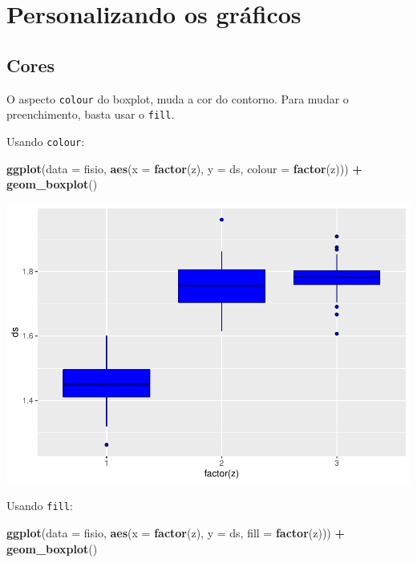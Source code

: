 \documentclass[
]{book}
\newenvironment{Shaded}{\begin{snugshade}}{\end{snugshade}}
\newcommand{\DataTypeTok}[1]{\textcolor[rgb]{0.13,0.29,0.53}{#1}}
\newcommand{\KeywordTok}[1]{\textcolor[rgb]{0.13,0.29,0.53}{\textbf{#1}}}
\newcommand{\NormalTok}[1]{#1}
\newcommand{\OperatorTok}[1]{\textcolor[rgb]{0.81,0.36,0.00}{\textbf{#1}}}
\newcommand{\StringTok}[1]{\textcolor[rgb]{0.31,0.60,0.02}{#1}}
\begin{document}
\hypertarget{personalizando-os-gruxe1ficos-1}{%
\section{Personalizando os gráficos}\label{personalizando-os-gruxe1ficos-1}}

\hypertarget{cores-1}{%
\subsection{Cores}\label{cores-1}}

O aspecto \texttt{colour} do boxplot, muda a cor do contorno. Para mudar o preenchimento, basta usar o \texttt{fill}.

Usando \texttt{colour}:

\begin{Shaded}
\begin{Highlighting}[]
\KeywordTok{ggplot}\NormalTok{(}\DataTypeTok{data =}\NormalTok{ fisio, }\KeywordTok{aes}\NormalTok{(}\DataTypeTok{x =} \KeywordTok{factor}\NormalTok{(z), }\DataTypeTok{y =}\NormalTok{ ds, }\DataTypeTok{colour =} \KeywordTok{factor}\NormalTok{(z))) }\OperatorTok{+}
\StringTok{  }\KeywordTok{geom_boxplot}\NormalTok{()}
\end{Highlighting}
\end{Shaded}

\includegraphics{TudodoR_files/figure-latex/unnamed-chunk-202-1.pdf}

Usando \texttt{fill}:

\begin{Shaded}
\begin{Highlighting}[]
\KeywordTok{ggplot}\NormalTok{(}\DataTypeTok{data =}\NormalTok{ fisio, }\KeywordTok{aes}\NormalTok{(}\DataTypeTok{x =} \KeywordTok{factor}\NormalTok{(z), }\DataTypeTok{y =}\NormalTok{ ds, }\DataTypeTok{fill =} \KeywordTok{factor}\NormalTok{(z))) }\OperatorTok{+}
\StringTok{  }\KeywordTok{geom_boxplot}\NormalTok{()}
\end{Highlighting}
\end{Shaded}
\end{document}
